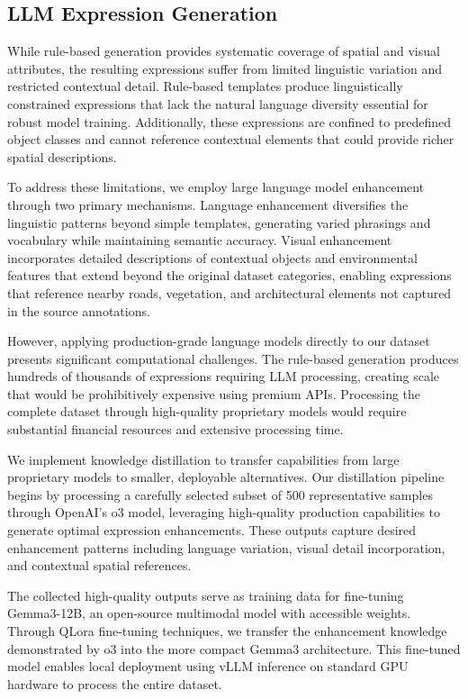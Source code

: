 \subsection{LLM Expression Generation}

While rule-based generation provides systematic coverage of spatial and visual attributes, the resulting expressions suffer from limited linguistic variation and restricted contextual detail. Rule-based templates produce linguistically constrained expressions that lack the natural language diversity essential for robust model training. Additionally, these expressions are confined to predefined object classes and cannot reference contextual elements that could provide richer spatial descriptions.

To address these limitations, we employ large language model enhancement through two primary mechanisms. Language enhancement diversifies the linguistic patterns beyond simple templates, generating varied phrasings and vocabulary while maintaining semantic accuracy. Visual enhancement incorporates detailed descriptions of contextual objects and environmental features that extend beyond the original dataset categories, enabling expressions that reference nearby roads, vegetation, and architectural elements not captured in the source annotations.

However, applying production-grade language models directly to our dataset presents significant computational challenges. The rule-based generation produces hundreds of thousands of expressions requiring LLM processing, creating scale that would be prohibitively expensive using premium APIs. Processing the complete dataset through high-quality proprietary models would require substantial financial resources and extensive processing time.

We implement knowledge distillation to transfer capabilities from large proprietary models to smaller, deployable alternatives. Our distillation pipeline begins by processing a carefully selected subset of 500 representative samples through OpenAI's o3 model, leveraging high-quality production capabilities to generate optimal expression enhancements. These outputs capture desired enhancement patterns including language variation, visual detail incorporation, and contextual spatial references.

The collected high-quality outputs serve as training data for fine-tuning Gemma3-12B, an open-source multimodal model with accessible weights. Through QLora fine-tuning techniques, we transfer the enhancement knowledge demonstrated by o3 into the more compact Gemma3 architecture. This fine-tuned model enables local deployment using vLLM inference on standard GPU hardware to process the entire dataset.

